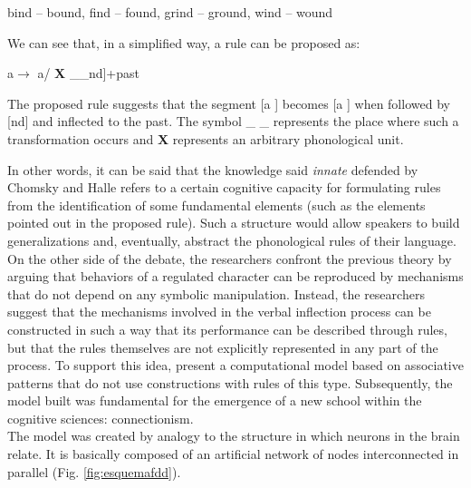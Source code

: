 \begin{center}
bind – bound, find – found, grind – ground, wind – wound
\end{center}

We can see that, in a simplified way, a rule can be proposed as:

\begin{center}
a\textsci $\rightarrow$ a\textupsilon / \textbf{X}  \_\_nd]+past
\end{center}

The proposed rule suggests that the segment [a \textsci] becomes [a \textupsilon] when followed by [nd] and inflected to the past. The symbol \_ \_ represents the place where such a transformation occurs and \textbf{X} represents an arbitrary phonological unit.

In other words, it can be said that the knowledge said \textit{innate} defended by Chomsky and Halle refers to a certain cognitive capacity for formulating rules from the identification of some fundamental elements (such as the elements pointed out in the proposed rule). Such a structure would allow speakers to build generalizations and, eventually, abstract the phonological rules of their language. \\

On the other side of the debate, the researchers \cite{rumelhart:1986} confront the previous theory by arguing that behaviors of a regulated character can be reproduced by mechanisms that do not depend on any symbolic manipulation. Instead, the researchers suggest that the mechanisms involved in the verbal inflection process can be constructed in such a way that its performance can be described through rules, but that the rules themselves are not explicitly represented in any part of the process. To support this idea, \cite{rumelhart:1986} present a computational model based on associative patterns that do not use constructions with rules of this type. Subsequently, the model built was fundamental for the emergence of a new school within the cognitive sciences: connectionism. \\




The model was created by analogy to the structure in which neurons in the brain relate. It is basically composed of an artificial network of nodes interconnected in parallel (Fig. \ref{fig:esquemafdd}).

